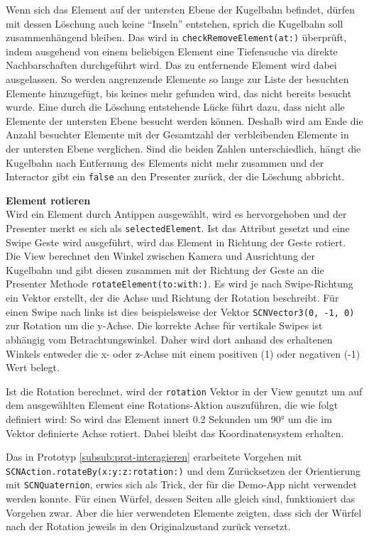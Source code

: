 Wenn sich das Element auf der untersten Ebene der Kugelbahn befindet, dürfen mit dessen Löschung auch keine "`Inseln"' entstehen, sprich die Kugelbahn soll zusammenhängend bleiben.
Das wird in \texttt{checkRemoveElement(at:)} überprüft, indem ausgehend von einem beliebigen Element eine Tiefensuche via direkte Nachbarschaften durchgeführt wird.
Das zu entfernende Element wird dabei ausgelassen.
So werden angrenzende Elemente so lange zur Liste der besuchten Elemente hinzugefügt, bis keines mehr gefunden wird, das nicht bereits besucht wurde.
Eine durch die Löschung entstehende Lücke führt dazu, dass nicht alle Elemente der untersten Ebene besucht werden können.
Deshalb wird am Ende die Anzahl besuchter Elemente mit der Gesamtzahl der verbleibenden Elemente in der untersten Ebene verglichen.
Sind die beiden Zahlen unterschiedlich, hängt die Kugelbahn nach Entfernung des Elements nicht mehr zusammen und der Interactor gibt ein \texttt{false} an den Presenter zurück, der die Löschung abbricht.

\textbf{Element rotieren} \\
Wird ein Element durch Antippen ausgewählt, wird es hervorgehoben und der Presenter merkt es sich als \texttt{selectedElement}.
Ist das Attribut gesetzt und eine Swipe Geste wird ausgeführt, wird das Element in Richtung der Geste rotiert.
Die View berechnet den Winkel zwischen Kamera und Ausrichtung der Kugelbahn und gibt diesen zusammen mit der Richtung der Geste an die Presenter Methode \texttt{rotateElement(to:with:)}.
Es wird je nach Swipe-Richtung ein Vektor erstellt, der die Achse und Richtung der Rotation beschreibt.
Für einen Swipe nach links ist dies beispielsweise der Vektor \texttt{SCNVector3(0, -1, 0)} zur Rotation um die y-Achse.
Die korrekte Achse für vertikale Swipes ist abhängig vom Betrachtungswinkel.
Daher wird dort anhand des erhaltenen Winkels entweder die x- oder z-Achse mit einem positiven (1) oder negativen (-1) Wert belegt.

Ist die Rotation berechnet, wird der \texttt{rotation} Vektor in der View genutzt um auf dem ausgewählten Element eine Rotations-Aktion auszuführen, die wie folgt definiert wird:
So wird das Element innert 0.2 Sekunden um 90° um die im Vektor definierte Achse rotiert.
Dabei bleibt das Koordinatensystem erhalten.

Das in Prototyp \ref{subsub:prot-interagieren} erarbeitete Vorgehen mit \texttt{SCNAction.rotateBy(x:y:z:rotation:)} und dem Zurücksetzen der Orientierung mit \texttt{SCNQuaternion}, erwies sich als Trick, der für die Demo-App nicht verwendet werden konnte.
Für einen Würfel, dessen Seiten alle gleich sind, funktioniert das Vorgehen zwar.
Aber die hier verwendeten Elemente zeigten, dass sich der Würfel nach der Rotation jeweils in den Originalzustand zurück versetzt. 

